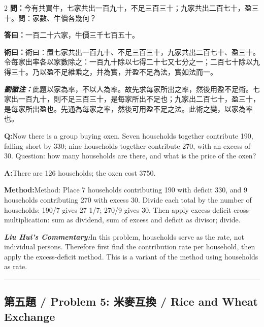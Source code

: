 \documentclass[11pt,a4paper]{article}
\newcommand{\cnwen}{\textcolor{cnlabelfg}{\textbf{問：}}}
\newcommand{\cnda}{\textbf{答曰：}}
\newcommand{\cnshu}{\textcolor{cnlabelfg}{\textbf{術曰：}}}
\newcommand{\cnzhu}{\textcolor{commentarycolor}{\textit{\textbf{劉徽注：}}}}
\newcommand{\enwen}{\textcolor{enlabelfg}{\textbf{Q:}}}
\newcommand{\enda}{\textcolor{enlabelfg}{\textbf{A:}}}
\newcommand{\enshu}{\textcolor{enlabelfg}{\textbf{Method:}}}
\newcommand{\enzhu}{\textcolor{enlabelfg}{\textit{\textbf{Liu Hui's Commentary:}}}}
\begin{document}
\begin{paracol}{2}
\switchcolumn[0]
\cnwen 今有共買牛，七家共出一百九十，不足三百三十；九家共出二百七十，盈三十。問：家數、牛價各幾何？

\cnda 一百二十六家，牛價三千七百五十。

\cnshu 術曰：置七家共出一百九十、不足三百三十，九家共出二百七十、盈三十。令每家出率各以家數除之：一百九十除以七得二十七又七分之一；二百七十除以九得三十。乃以盈不足維乘之，并為實，并盈不足為法，實如法而一。

\cnzhu 此題以家為率，不以人為率。故先求每家所出之率，然後用盈不足術。七家出一百九十，則不足三百三十，是每家所出不足也；九家出二百七十，盈三十，是每家所出盈也。先通為每家之率，然後可用盈不足之法。此術之變，以家為率也。

\switchcolumn[1]
\enwen Now there is a group buying oxen. Seven households together contribute 190, falling short by 330; nine households together contribute 270, with an excess of 30. Question: how many households are there, and what is the price of the oxen?

\enda There are 126 households; the oxen cost 3750.

\enshu Method: Place 7 households contributing 190 with deficit 330, and 9 households contributing 270 with excess 30. Divide each total by the number of households: 190/7 gives 27 1/7; 270/9 gives 30. Then apply excess-deficit cross-multiplication: sum as dividend, sum of excess and deficit as divisor; divide.

\enzhu In this problem, households serve as the rate, not individual persons. Therefore first find the contribution rate per household, then apply the excess-deficit method. This is a variant of the method using households as rate.
\end{paracol}

\bigskip\hrule\bigskip

\subsection{第五題 / Problem 5: 米麥互換 / Rice and Wheat Exchange}
\end{document}
